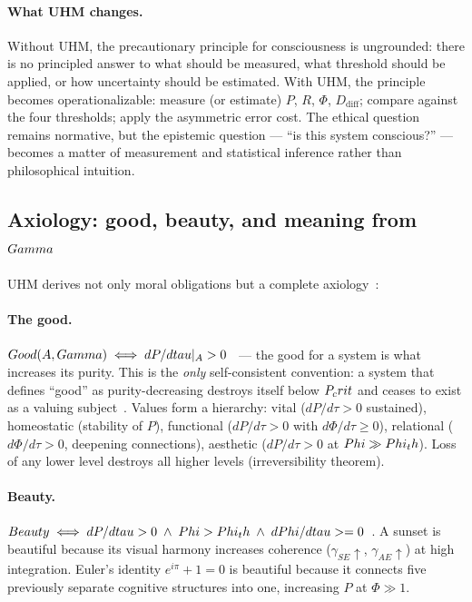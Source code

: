 \paragraph{What UHM changes.}
Without UHM, the precautionary principle for consciousness is ungrounded:
there is no principled answer to what should be measured, what threshold
should be applied, or how uncertainty should be estimated. With UHM, the
principle becomes operationalizable: measure (or estimate) $P$, $R$,
$\Phi$, $D_{\mathrm{diff}}$; compare against the four thresholds; apply the
asymmetric error cost. The ethical question remains normative, but the
epistemic question --- ``is this system conscious?'' --- becomes a matter
of measurement and statistical inference rather than philosophical
intuition.

\subsection{Axiology: good, beauty, and meaning from $Gamma$}
\label{subsec:axiology}

UHM derives not only moral obligations but a complete axiology~:

\paragraph{The good.}
$Good(A, Gamma) \iff dP/dtau|_A > 0$~ --- the good for a system is
what increases its purity. This is the \emph{only} self-consistent convention: a system
that defines ``good'' as purity-decreasing destroys itself below $P_crit$ and ceases to
exist as a valuing subject~. Values form a hierarchy: vital ($dP/d\tau > 0$
sustained), homeostatic (stability of $P$), functional ($dP/d\tau > 0$ with
$d\Phi/d\tau \geq 0$), relational ($d\Phi/d\tau > 0$, deepening connections), aesthetic
($dP/d\tau > 0$ at $Phi \gg Phi_th$). Loss of any lower level destroys all higher
levels (irreversibility theorem).

\paragraph{Beauty.}
$Beauty \iff dP/dtau > 0 \;\wedge\; Phi > Phi_th \;\wedge\;
dPhi/dtau >= 0$~. A sunset is beautiful because its visual harmony
increases coherence ($\gamma_{SE} \uparrow$, $\gamma_{AE} \uparrow$) at high integration.
Euler's identity $e^{i\pi} + 1 = 0$ is beautiful because it connects five previously
separate cognitive structures into one, increasing $P$ at $\Phi \gg 1$.

